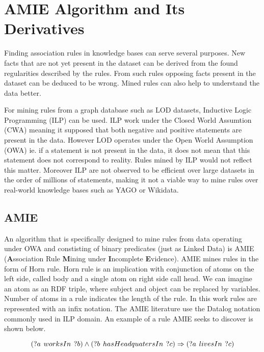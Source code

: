 \chapter{AMIE Algorithm and Its Derivatives}

Finding association rules in knowledge bases can serve several purposes. New facts that are not yet present in the dataset can be derived from the found regularities described by the rules. From such rules opposing facts present in the dataset can be deduced to be wrong. Mined rules can also help to understand the data better.

For mining rules from a graph database such as LOD datasets, Inductive Logic Programming (ILP) can be used. ILP work under the Closed World Assumtion (CWA) meaning it supposed that both negative and positive statements are present in the data. However LOD operates under the Open World Assumption (OWA) ie. if a statement is not present in the data, it does not mean that this statement does not correspond to reality. Rules mined by ILP would not reflect this matter. Moreover ILP are not observed to be efficient over large datasets in the order of millions of statements, making it not a viable way to mine rules over real-world knowledge bases such as YAGO or Wikidata.

\section{AMIE\label{amie}}

An algorithm that is specifically designed to mine rules from data operating under OWA and constisting of binary predicates (just as Linked Data) is AMIE (\textbf{A}ssociation Rule \textbf{M}ining under \textbf{I}ncomplete \textbf{E}vidence).\cite{Galarraga2013} AMIE mines rules in the form of Horn rule. Horn rule is an implication with conjunction of atoms on the left side, called body and a single atom on right side call head. We can imagine an atom as an RDF triple, where subject and object can be replaced by variables. Number of atoms in a rule indicates the length of the rule. In this work rules are represented with an infix notation. The AMIE literature use the Datalog notation commonly used in ILP domain. An example of a rule AMIE seeks to discover is shown below. 

\label{asocRule}
$$
(?a\hspace{0.4em}worksIn\hspace{0.4em}?b) \land
(?b\hspace{0.4em}hasHeadquatersIn\hspace{0.4em}?c) \Rightarrow
(?a\hspace{0.4em}livesIn\hspace{0.4em}?c)
$$

